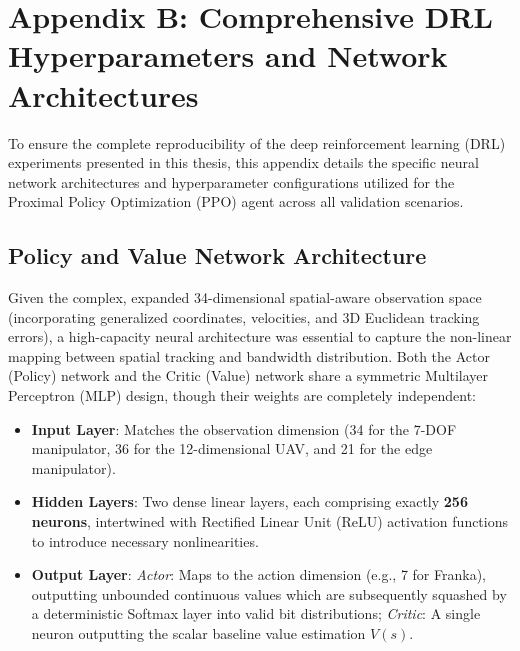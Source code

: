 \section{Appendix B: Comprehensive DRL Hyperparameters and Network Architectures}
To ensure the complete reproducibility of the deep reinforcement learning (DRL) experiments presented in this thesis, this appendix details the specific neural network architectures and hyperparameter configurations utilized for the Proximal Policy Optimization (PPO) agent across all validation scenarios.
\subsection{Policy and Value Network Architecture}
Given the complex, expanded 34-dimensional spatial-aware observation space (incorporating generalized coordinates, velocities, and 3D Euclidean tracking errors), a high-capacity neural architecture was essential to capture the non-linear mapping between spatial tracking and bandwidth distribution. 
Both the Actor (Policy) network and the Critic (Value) network share a symmetric Multilayer Perceptron (MLP) design, though their weights are completely independent:
\begin{itemize}
    \item \textbf{Input Layer}: Matches the observation dimension (34 for the 7-DOF manipulator, 36 for the 12-dimensional UAV, and 21 for the edge manipulator).
    \item \textbf{Hidden Layers}: Two dense linear layers, each comprising exactly \textbf{256 neurons}, intertwined with Rectified Linear Unit (ReLU) activation functions to introduce necessary nonlinearities.
    \item \textbf{Output Layer}: \textit{Actor}: Maps to the action dimension (e.g., 7 for Franka), outputting unbounded continuous values which are subsequently squashed by a deterministic Softmax layer into valid bit distributions; \textit{Critic}: A single neuron outputting the scalar baseline value estimation $V(s)$.
\end{itemize}
